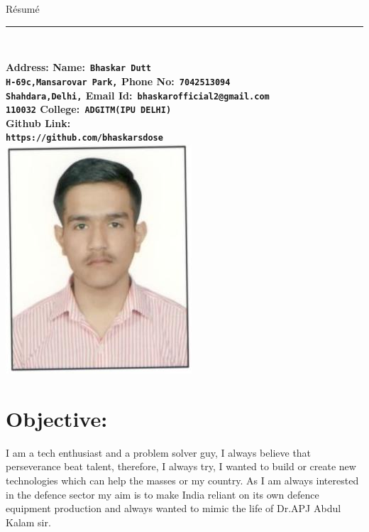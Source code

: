 \documentclass[10pt]{report}
\begin{document}
	
{\huge\hspace{210pt}R\'{e}sum\'{e}}
\\{\noindent\rule{17.8cm}{2pt}\\[4pt]}
\bf Address: \hspace{259pt}\bf Name:\verb| Bhaskar Dutt|
\\
\verb"H-69c,Mansarovar Park,"  \hspace{188pt}\bf Phone No:\verb" 7042513094"
\\{\verb"Shahdara,Delhi,"}   \hspace{225pt}\bf Email Id:\verb" bhaskarofficial2@gmail.com"
\\{\verb"110032"}    \hspace{272pt}\bf College:\verb" ADGITM(IPU DELHI)"
\\\hspace{250pt}\bf Github Link:\\\verb|https://github.com/bhaskarsdose| \\[1pt]
	                  

{\hspace{330pt}\includegraphics[scale =0.5]{bhaskar}\\[3pt]} %
\section*{Objective:} %
\normalfont I am a tech enthusiast and a problem solver guy, I always believe that perseverance beat talent, therefore, I always try, I wanted to build or create new technologies which can help the masses or my country. As I am always interested in the defence sector my aim is to make India reliant on its own defence equipment production and always wanted to mimic the life of Dr.APJ Abdul Kalam sir.
\end{document}
